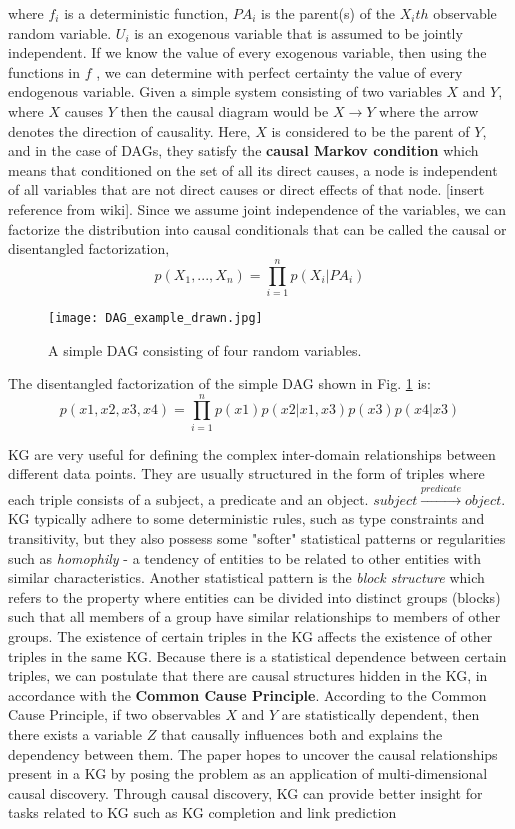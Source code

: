 \documentclass{article}
\begin{document}
where $f_i$ is a deterministic function, \textbf{$PA_i$} is the parent(s) of the $X_ith$ observable random variable. $U_i$ is an exogenous variable that is assumed to be jointly independent. If we know the value of every exogenous variable, then using the functions in $f$ , we can determine with perfect certainty the value of every endogenous variable. Given a simple system consisting of two variables $X$ and $Y$, where $X$ causes $Y$ then the causal diagram would be $X \rightarrow Y$ where the arrow denotes the direction of causality. Here, $X$ is considered to be the parent of $Y$, and in the case of DAGs, they satisfy the \textbf{causal Markov condition} which means that conditioned on the set of all its direct causes, a node is independent of all variables that are not direct causes or direct effects of that node. [insert reference from wiki]. Since we assume joint independence of the variables, we can factorize the distribution into causal conditionals that can be called the causal or disentangled factorization,
\begin{equation}
    p(X_1,...,X_n) = \prod_{i=1}^{n} p(X_i|PA_i) 
\end{equation}

\begin{figure}
    \centering
    \texttt{[image: DAG\_example\_drawn.jpg]}
    \caption{A simple DAG consisting of four random variables.}
    \label{fig:my_label}
\end{figure}
The disentangled factorization of the simple DAG shown in Fig. \ref{fig:my_label} is:
\begin{equation}
    p(x1,x2,x3,x4) = \prod_{i=1}^n p(x1)p(x2|x1,x3)p(x3)p(x4|x3)
\end{equation}

KG are very useful for defining the complex inter-domain relationships between different data points. They are usually structured in the form of triples where each triple consists of a subject, a predicate and an object. $subject \xrightarrow{predicate} object$. KG typically adhere to some deterministic rules, such as type constraints and transitivity, but they also possess some "softer" statistical patterns or regularities such as \textit{homophily} - a tendency of entities to be related to other entities with similar characteristics. Another statistical pattern is the \textit{block structure} which refers to the property where entities can be divided into distinct groups (blocks) such that all members of a group have similar relationships to members of other groups. 
The existence of certain triples in the KG affects the existence of other triples in the same KG. Because there is a statistical dependence between certain triples, we can postulate that there are causal structures hidden in the KG, in accordance with the \textbf{Common Cause Principle}. According to the Common Cause Principle, if two observables $X$ and $Y$ are statistically dependent, then there exists a variable $Z$ that causally influences both and explains the dependency between them. The paper hopes to uncover the causal relationships present in a KG by posing the problem as an application of multi-dimensional causal discovery. Through causal discovery, KG can provide better insight for tasks related to KG such as KG completion and link prediction
\fi
\end{document}
